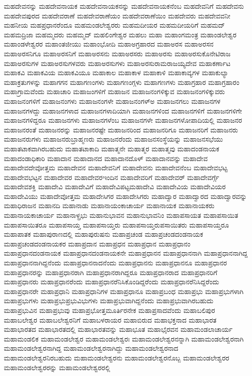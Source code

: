 {ಮಹದೇವನನ್ನು
ಮಹದೇವನಾಯಕ
ಮಹದೇವನಾಯಕನನ್ನು
ಮಹದೇವನಾಯಕನೆಂಬ
ಮಹದೇವನಿಗೆ
ಮಹದೇವನು
ಮಹದೇವಪುರದ
ಮಹದೇವರಾಣೆ
ಮಹದೇವರಾಣೆಯಂ
ಮಹದೇವರಾಣೆಯಿಂ
ಮಹದೇವರು
ಮಹದೇವವನೀ
ಮಹನೀಯ
ಮಹಪ್ರಧಾನರೆಂದೂ
ಮಹಮಂಡಲೇಶ್ವರರು
ಮಹಮದೀಯರ
ಮಹಮದೀಯರಿಗೆ
ಮಹಮದ್
ಮಹಮದ್ರಿಜಾ
ಮಹಮ್ಮದರು
ಮಹಮ್ಮದ್
ಮಹಲಿಂಗೇಶ್ವರ
ಮಹಲು
ಮಹಾ
ಮಹಾಂಗಮಂತ್ರ
ಮಹಾಂಡಲೇಶ್ವರ
ಮಹಾಂಡಳೇಶ್ವರರ
ಮಹಾಂತಜೀಯು
ಮಹಾಂಭೋದಿ
ಮಹಾಅಗ್ರಹಾರದ
ಮಹಾಅರಸ
ಮಹಾಅರಸನ
ಮಹಾಅರಸನಿಗೂ
ಮಹಾಅರಸನಿಗೆ
ಮಹಾಅರಸನು
ಮಹಾಅರಸರು
ಮಹಾಅರಸು
ಮಹಾಅರಸುಕೊನೇಟಿರಾಜ
ಮಹಾಅರಸುಗಳ
ಮಹಾಅರಸುಗಳವರು
ಮಹಾಅರಸುಗಳು
ಮಹಾಅರಸುರಾಮರಾಜಯ್ಯದೇವ
ಮಹಾಕರ್ಣಾಟ
ಮಹಾಕವಿ
ಮಹಾಕವಿಯ
ಮಹಾಕವಿಯೂ
ಮಹಾಕಾಲ
ಮಹಾಕಾಳ
ಮಹಾಕಾಳಿ
ಮಹಾಕಾವ್ಯಗಳ
ಮಹಾಕುಲ್ಯಾ
ಮಹಾಕ್ರತುಗಳನ್ನು
ಮಹಾಗಗನ
ಮಹಾಗಣಂಗಳು
ಮಹಾಗಣಂಗ್ಗಳು
ಮಹಾಗಣಗಳು
ಮಹಾಗ್ರಹಾರ
ಮಹಾಗ್ರಹಾರಂ
ಮಹಾಗ್ರಾಮವೆಂದು
ಮಹಾಚಾರಿ
ಮಹಾಜಂಗಳಿಗೆ
ಮಹಾಜನ
ಮಹಾಜನಂಗಳಿಕ್ಕುವ
ಮಹಾಜನಂಗಳಿಕ್ಕುವರು
ಮಹಾಜನಂಗಳಿಗೆ
ಮಹಾಜನಂಗಳು
ಮಹಾಜನಂಗಳೇ
ಮಹಾಜನಂಗಳ್ಅ
ಮಹಾಜನಗಲು
ಮಹಾಜನಗಳ
ಮಹಾಜನಗಳದ್ದು
ಮಹಾಜನಗಳಾದ
ಮಹಾಜನಗಳಾದಿಯಾಗಿ
ಮಹಾಜನಗಳಿಂದ
ಮಹಾಜನಗಳಿಗೆ
ಮಹಾಜನಗಳಿಗೇ
ಮಹಾಜನಗಳಿದ್ದರೂ
ಮಹಾಜನಗಳು
ಮಹಾಜನಗಳೆಂಬ
ಮಹಾಜನಗಳೇ
ಮಹಾಜನಗಳೋಪಾದಿಯಲ್ಲಿ
ಮಹಾಜನರ
ಮಹಾಜನರಂತೆ
ಮಹಾಜನರನ್ನು
ಮಹಾಜನರಷ್ಟೇ
ಮಹಾಜನರಿಂದ
ಮಹಾಜನರಿಗೂ
ಮಹಾಜನರಿಗೆ
ಮಹಾಜನರು
ಮಹಾಜನರುಗಳು
ಮಹಾಜನರುಬ್ರಾಹ್ಮಣರು
ಮಹಾಜನರೆಂದು
ಮಹಾಜನಸಂಸ್ಥೆಯನ್ನು
ಮಹಾಜನಸಭೆಯು
ಮಹಾತಟಾಕವಾಗಿರಬಹುದು
ಮಹಾತಟಾಕಾದಿ
ಮಹಾತ್ಮನೇ
ಮಹಾತ್ಮರ
ಮಹಾತ್ಮವು
ಮಹಾದಂಡನಾಯಕ
ಮಹಾದಂಡಾಧಿಕಾರಿ
ಮಹಾದಾನ
ಮಹಾದಾನದ
ಮಹಾದಾನದೊಳ್
ಮಹಾದಾನವನ್ನು
ಮಹಾದೇವ
ಮಹಾದೇವದೇವೋತ್ತಮ
ಮಹಾದೇವನ
ಮಹಾದೇವನಿಗೆ
ಮಹಾದೇವನು
ಮಹಾದೇವನೆಂಬ
ಮಹಾದೇವಭಟ್ಟ
ಮಹಾದೇವಭಟ್ಟನ
ಮಹಾದೇವರ
ಮಹಾದೇವರಇಂದಿನ
ಮಹಾದೇವರಿಗೆ
ಮಹಾದೇವರ್
ಮಹಾದೇವರ್ಗ್ಗೆ
ಮಹಾದೇವಶಕ್ತಿ
ಮಹಾದೇವಿ
ಮಹಾದೇವಿಗೆ
ಮಹಾದೇವಿಪಟ್ಟಮಹಾದೇವಿ
ಮಹಾದೇವಿಯ
ಮಹಾದೇವಿಯರ
ಮಹಾದೇವಿಯು
ಮಹಾದೇವೋತ್ತಮ
ಮಹಾದೇಸಿಗರ
ಮಹಾದೇಸಿಗರು
ಮಹಾದ್ವಾರ
ಮಹಾದ್ವಾರದ
ಮಹಾದ್ವಾರವನ್ನು
ಮಹಾಧಿರಾಜನ
ಮಹಾನದಿ
ಮಹಾನಾಡು
ಮಹಾನಾಯಂಕಾಚಾರ್ಯ
ಮಹಾನಾಯಕ
ಮಹಾನಾಯಕರು
ಮಹಾನಾಯಕಾಚಾರ್ಯ
ಮಹಾನಾಳ್ಪ್ರಭು
ಮಹಾನುಭಾವನ
ಮಹಾನುಭಾವನಿಂ
ಮಹಾಪಸಾಯತ
ಮಹಾಪಸಾಯಿತ
ಮಹಾಪಸಾಯಿತರೂ
ಮಹಾಪಸಾಯ್ತ
ಮಹಾಪಸಾಯ್ತರು
ಮಹಾಪಸಾಯ್ತರುಪಸಾಯಿತರು
ಮಹಾಪಸಾಯ್ತರೂ
ಮಹಾಪಾತಕ
ಮಹಾಪುರಾಣದಲ್ಲಿ
ಮಹಾಪುರುಷನು
ಮಹಾಪ್ರಚಂಡ
ಮಹಾಪ್ರಚಂಡದಂಡನಾಯಕ
ಮಹಾಪ್ರಚಂಡದಂಡನಾಯಕರ
ಮಹಾಪ್ರದಾನ
ಮಹಾಪ್ರಧನ
ಮಹಾಪ್ರಧಾನ
ಮಹಾಪ್ರಧಾನಂ
ಮಹಾಪ್ರಧಾನದಂಡನಾಯಕ
ಮಹಾಪ್ರಧಾನದಂಡನಾಯಕನೇ
ಮಹಾಪ್ರಧಾನನ
ಮಹಾಪ್ರಧಾನನಾಗಿ
ಮಹಾಪ್ರಧಾನನಾಗಿದ್ದ
ಮಹಾಪ್ರಧಾನನಾಗಿದ್ದನೆಂದು
ಮಹಾಪ್ರಧಾನನಾದನೆಂದು
ಮಹಾಪ್ರಧಾನನು
ಮಹಾಪ್ರಧಾನನೂ
ಮಹಾಪ್ರಧಾನರ
ಮಹಾಪ್ರಧಾನರನ್ನು
ಮಹಾಪ್ರಧಾನರಾಗಿ
ಮಹಾಪ್ರಧಾನರಾಗಿದ್ದರೂ
ಮಹಾಪ್ರಧಾನರಾದ
ಮಹಾಪ್ರಧಾನರಿಗೆ
ಮಹಾಪ್ರಧಾನರು
ಮಹಾಪ್ರಧಾನರೆಂದು
ಮಹಾಪ್ರಧಾನರೆನಿಸಿಕೊಂಡಿದ್ದರೆಂದು
ಮಹಾಪ್ರಧಾನರೆನಿಸಿದ್ದರೆಂದು
ಮಹಾಪ್ರಧಾನರೇ
ಮಹಾಪ್ರಧಾನಿ
ಮಹಾಪ್ರಧಾನಿಗಳ
ಮಹಾಪ್ರಧಾನೂ
ಮಹಾಪ್ರಬಂಧ
ಮಹಾಪ್ರಭು
ಮಹಾಪ್ರಭುಗಳಾಗಿ
ಮಹಾಪ್ರಭುಗಳು
ಮಹಾಪ್ರಭುಪ್ರಭುವಿಭುಗಳು
ಮಹಾಪ್ರಭುವಾಗಿದ್ದನೆಂದು
ಮಹಾಪ್ರಭುವಾಗಿರಬಹುದು
ಮಹಾಪ್ರಭುವಿನ
ಮಹಾಪ್ರಭುವು
ಮಹಾಪ್ರಭೋತ್ತಮೂರ್ತಿರನೇಕ
ಮಹಾಪ್ರಸಾದವೆಂದು
ಮಹಾಬಲಿಪುರ
ಮಹಾಬಲೇಶ್ವರ
ಮಹಾಬಲೇಶ್ವರನಿಗೆ
ಮಹಾಬಳರಾಯರ
ಮಹಾಬಿರುದ
ಮಹಾಭಕ್ತನಾದ
ಮಹಾಭಾರತ
ಮಹಾಭಾರತದ
ಮಹಾಭಾರತದಲ್ಲಿ
ಮಹಾಭಾರತವನ್ನು
ಮಹಾಭೂತ
ಮಹಾಭೈರವನ
ಮಹಾಮಂಡಲಾಚಾರ್ಯ
ಮಹಾಮಂಡಲಿಕ
ಮಹಾಮಂಡಲೇಶ್ವರ
ಮಹಾಮಂಡಲೇಶ್ವರಃ
ಮಹಾಮಂಡಲೇಶ್ವರನನ್ನಾಗಿ
ಮಹಾಮಂಡಲೇಶ್ವರನಾಗಿ
ಮಹಾಮಂಡಲೇಶ್ವರನಾಗಿದ್ದ
ಮಹಾಮಂಡಲೇಶ್ವರನಾಗಿದ್ದು
ಮಹಾಮಂಡಲೇಶ್ವರನಾದ
ಮಹಾಮಂಡಲೇಶ್ವರನಿರಬಹುದು
ಮಹಾಮಂಡಲೇಶ್ವರನು
ಮಹಾಮಂಡಲೇಶ್ವರನೊಬ್ಬ
ಮಹಾಮಂಡಲೇಶ್ವರರ
ಮಹಾಮಂಡಲೇಶ್ವರರನ್ನು
ಮಹಾಮಂಡಲೇಶ್ವರರಲ್ಲಿ
}
